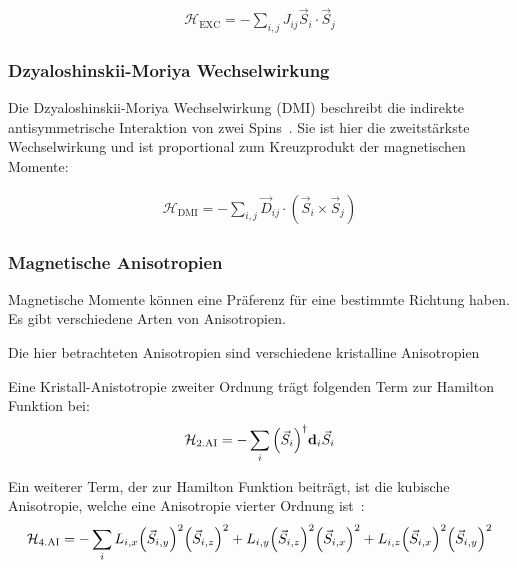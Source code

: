 \documentclass[main.tex]{subfiles}
\begin{document}
\begin{align}
	\mathcal{H}_{\text{EXC}} = -\sum_{i,j} J_{ij} \vec{S}_i \cdot
	\vec{S}_j\label{eq:hamilton-heisenberg-exc}
\end{align}

\subsubsection*{Dzyaloshinskii-Moriya Wechselwirkung}

Die Dzyaloshinskii-Moriya Wechselwirkung (DMI) beschreibt die indirekte antisymmetrische Interaktion von zwei Spins~\cite{DMI}.
Sie ist hier die zweitstärkste Wechselwirkung und ist proportional zum Kreuzprodukt der magnetischen Momente:

\begin{align}
	\mathcal{H}_{\text{DMI}} = -\sum_{i,j} \vec{D}_{ij} \cdot (\vec{S}_i
	\times
	\vec{S}_j)\label{eq:hamilton-dmi}
\end{align}


\subsubsection*{Magnetische Anisotropien}
Magnetische Momente können eine Präferenz für eine bestimmte Richtung haben.
Es gibt verschiedene Arten von Anisotropien.

Die hier betrachteten Anisotropien sind verschiedene kristalline Anisotropien


Eine Kristall-Anistotropie zweiter Ordnung trägt folgenden Term zur Hamilton Funktion bei:
\begin{align}
	\mathcal{H}_{\text{2.AI}} = -\sum_{i} \qty(\vec{S}_i)^\dagger
	\bm{\mathrm{d}}_i
	\vec{S}_i\label{eq:hamilton-2a}
\end{align}


Ein weiterer Term, der zur Hamilton Funktion beiträgt, ist die kubische Anisotropie, welche eine Anisotropie vierter Ordnung ist~\cite{GrossMarx}:
\begin{align}
	\mathcal{H}_{\text{4.AI}} = -\sum_{i} L_{i,x} \qty(\vec{S}_{i,y})^2 \qty(\vec{S}_{i,z})^2 
	+ L_{i,y} \qty(\vec{S}_{i,z})^2 \qty(\vec{S}_{i,x})^2 
	+ L_{i,z} \qty(\vec{S}_{i,x})^2 \qty(\vec{S}_{i,y})^2\label{eq:hamilton-4a}
\end{align}
\end{document}
